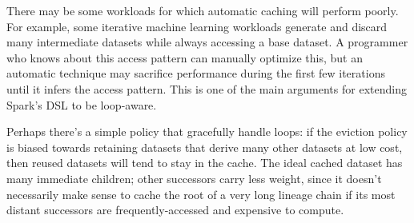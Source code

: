 \documentclass[12pt]{article}
\begin{document}
There may be some workloads for which automatic caching will perform poorly.
For example, some iterative machine learning workloads generate and discard
many intermediate datasets while always accessing a base dataset.
A programmer who knows about this access pattern can manually optimize this,
but an automatic technique may sacrifice performance during the first few
iterations until it infers the access pattern.  This is one of the main
arguments for extending Spark's DSL to be loop-aware.

Perhaps there's a simple policy that gracefully handle loops: if the eviction
policy is biased towards retaining datasets that derive many other datasets at
low cost, then reused datasets will tend to stay in the cache.  The ideal
cached dataset has many immediate children; other successors carry less weight,
since it doesn't necessarily make sense to cache the root of a very long
lineage chain if its most distant successors are frequently-accessed and
expensive to compute.




\end{document}
